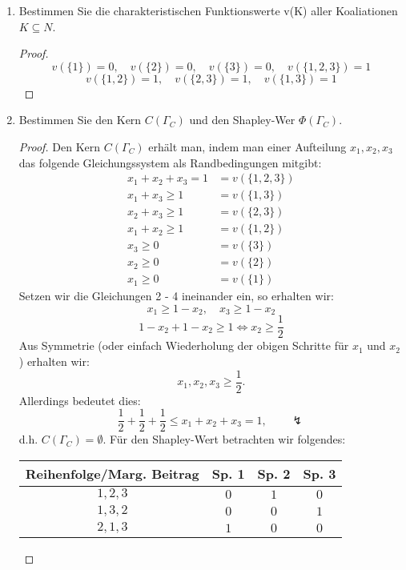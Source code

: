 \documentclass[12pt]{extreport} %
\theoremstyle{named}
\theoremstyle{itshape}
\theoremstyle{normal}
\begin{document}
\begin{enumerate}
	\item Bestimmen Sie die charakteristischen Funktionswerte v(K) aller Koaliationen $K \subseteq N$.
		\begin{proof}
			$$ v(\{ 1 \}) = 0, \quad v(\{ 2 \}) = 0, \quad v(\{ 3 \}) = 0, \quad v(\{ 1, 2,3 \}) = 1  $$
			$$ v(\{ 1, 2 \}) = 1, \quad  v(\{ 2, 3 \}) = 1, \quad v(\{ 1, 3 \}) = 1 $$
		\end{proof}
	\item Bestimmen Sie den Kern $C(\Gamma_C)$ und den Shapley-Wer $\Phi(\Gamma_C)$.
		\begin{proof}
			Den Kern $C(\Gamma_C)$ erhält man, indem man einer Aufteilung $x_1, x_2, x_3$ das folgende Gleichungssystem als Randbedingungen mitgibt:
			\begin{align*}
				x_{1} + x_{2} + x_{3} = 1 & = v(\{1, 2, 3 \}) \\
				x_{1} + x_{3} \geq 1 & = v(\{1, 3 \}) \\
				x_{2} + x_{3} \geq 1 & = v(\{ 2, 3 \}) \\
				x_{1} + x_{2} \geq 1 & = v(\{ 1, 2 \}) \\
				x_{3} \geq 0 & = v(\{ 3 \}) \\
			    x_{2} \geq 0 & = v(\{ 2 \}) \\
				x_{1} \geq 0 & = v(\{ 1 \})
			\end{align*}
			Setzen wir die Gleichungen 2 - 4 ineinander ein, so erhalten wir:
			$$ x_{1} \geq 1 - x_{2}, \quad x_{3} \geq 1 - x_{2} $$
			$$ 1 - x_{2} + 1 - x_{2} \geq 1 \iff x_{2} \geq \frac{1}{2} $$
			Aus Symmetrie (oder einfach Wiederholung der obigen Schritte für $x_{1}$ und $x_{2}$) erhalten wir:
			$$ x_{1}, x_{2}, x_{3} \geq \frac{1}{2}. $$
			Allerdings bedeutet dies:
			\begin{equation*}
				\frac{1}{2} + \frac{1}{2} + \frac{1}{2} \leq x_{1} + x_{2} + x_{3} = 1, \qquad \lightning
			\end{equation*} 
			d.h. $C(\Gamma_C) = \emptyset$. 
			Für den Shapley-Wert betrachten wir folgendes:
			\begin{center}
    			\begin{tabular}{| c | c | c | c |}
   					\hline
    					Reihenfolge/Marg. Beitrag &  Sp. 1 & Sp. 2 & Sp. 3  \\ 
    						\hline
    					$1, 2, 3$ & $0$ & $1$ & $0$  \\ 
    						\hline
    					$1, 3, 2$ & $0$ & $0$ & $1$  \\
    						\hline
    					$2, 1, 3$ & $1$ & $0$ & $0$  \\

\end{tabular}
\end{center}
\end{proof}
\end{enumerate}
\end{document}
